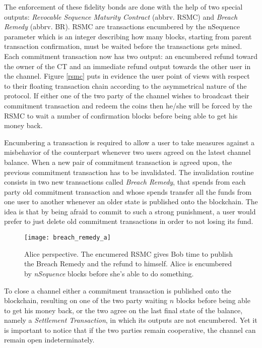 		The enforcement of these fidelity bonds are done with the help of two special outputs: \textit{Revocable Sequence Maturity Contract} (abbrv. RSMC) and \textit{Breach Remedy} (abbrv. BR). RSMC are transactions encumbered by the nSequence parameter which is an integer describing how many blocks, starting from parent transaction confirmation, must be waited before the transactions gets mined. Each commitment transaction now has two output: an encumbered refund toward the owner of the CT and an immediate refund output towards the other user in the channel. 
		Figure \ref{rsmc} puts in evidence the user point of views with respect to their floating transaction chain according to the asymmetrical nature of the protocol. If either one of the two party of the channel wishes to broadcast their commitment transaction and redeem the coins then he/she will be forced by the RSMC to wait a number of confirmation blocks before being able to get his money back.
		
		Encumbering a transaction is required to allow a user to take measures against a misbehavior of the counterpart whenever two users agreed on the latest channel balance. When a new pair of commitment transaction is agreed upon, the previous commitment transaction has to be invalidated. The invalidation routine consists in two new transactions called \textit{Breach Remedy}, that spends from each party old commitment transaction and whose spends transfer all the funds from one user to another whenever an older state is published onto the blockchain. The idea is that by being afraid to commit to such a strong punishment, a user would prefer to just delete old commitment transactions in order to not losing its fund.
		
		\begin{figure}
			\centering
			\texttt{[image: breach\_remedy\_a]}
			\caption{Alice perspective. The encumered RSMC gives Bob time to publish the Breach Remedy and the refund to himself. Alice is encumbered by \textit{nSequence} blocks before she's able to do something.}
		\end{figure}
				
		To close a channel either a commitment transaction is published onto the blockchain, resulting on one of the two party waiting \(n\) blocks before being able to get his money back, or the two agree on the last final state of the balance, namely a \textit{Settlement Transaction}, in which its outputs are not encumbered. Yet it is important to notice that if the two parties remain cooperative, the channel can remain open indeterminately.
		
